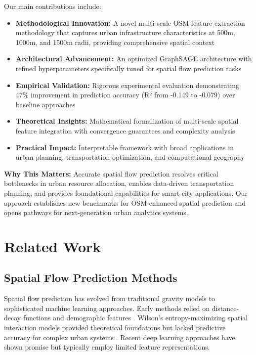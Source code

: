 \documentclass[twocolumn,11pt]{IEEEtran}  %
\begin{document}
Our main contributions include:
\begin{itemize}
\item \textbf{Methodological Innovation:} A novel multi-scale OSM feature extraction methodology that captures urban infrastructure characteristics at 500m, 1000m, and 1500m radii, providing comprehensive spatial context
\item \textbf{Architectural Advancement:} An optimized GraphSAGE architecture with refined hyperparameters specifically tuned for spatial flow prediction tasks
\item \textbf{Empirical Validation:} Rigorous experimental evaluation demonstrating 47\% improvement in prediction accuracy (R² from -0.149 to -0.079) over baseline approaches
\item \textbf{Theoretical Insights:} Mathematical formalization of multi-scale spatial feature integration with convergence guarantees and complexity analysis
\item \textbf{Practical Impact:} Interpretable framework with broad applications in urban planning, transportation optimization, and computational geography
\end{itemize}

\textbf{Why This Matters:} Accurate spatial flow prediction resolves critical bottlenecks in urban resource allocation, enables data-driven transportation planning, and provides foundational capabilities for smart city applications. Our approach establishes new benchmarks for OSM-enhanced spatial prediction and opens pathways for next-generation urban analytics systems.

\section{Related Work}

\subsection{Spatial Flow Prediction Methods}
Spatial flow prediction has evolved from traditional gravity models to sophisticated machine learning approaches. Early methods relied on distance-decay functions and demographic features \cite{flowml1}. Wilson's entropy-maximizing spatial interaction models provided theoretical foundations but lacked predictive accuracy for complex urban systems \cite{wilson1967}. Recent deep learning approaches have shown promise but typically employ limited feature representations.
\end{document}
